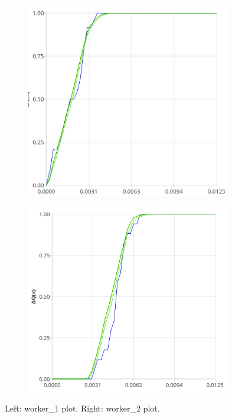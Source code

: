             \begin{figure}[H]
                \centering
                \begin{subfigure}{.5\textwidth}
                    \centering
                    \includegraphics[width =0.98\textwidth]{img/atfw1.png}
                    \label{fig:atfw1}
                \end{subfigure}%
                \begin{subfigure}{.5\textwidth}%
                    \centering%
                    \includegraphics[width =0.98\textwidth]{img/atfw2.png}%
                    \label{fig:atfw2}%
                \end{subfigure}%
                \caption{Left: worker\_1 plot. Right: worker\_2 plot.}
                \label{fig:atf}%
            \end{figure}%

